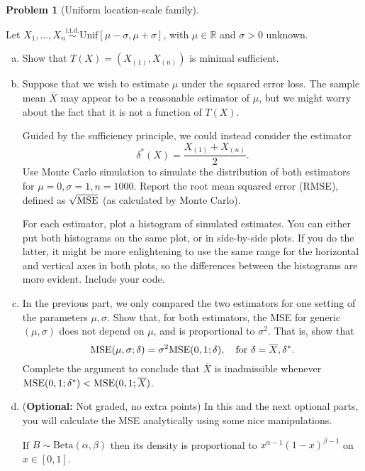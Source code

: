 \documentclass{article}
\newcommand{\RR}{\mathbb{R}}
\newcommand{\MSE}{\textnormal{MSE}}
\newcommand{\simiid}{\overset{\text{i.i.d.}}{\sim}}
\theoremstyle{definition}
\newtheorem{problem}{Problem}
\begin{document}
\begin{problem}[Uniform location-scale family]
\label{prob:uniflocscale}

Let $X_1, \ldots, X_n\simiid \text{Unif}[\mu-\sigma, \mu + \sigma]$, with $\mu\in\RR$ and $\sigma > 0$ unknown.
%
\begin{enumerate}[(a)]
\item Show that $T(X) = (X_{(1)}, X_{(n)})$ is minimal sufficient.



\item Suppose that we wish to estimate $\mu$ under the squared error loss.  The sample mean $\overline{X}$ may appear to be a reasonable estimator of $\mu$, but we might worry about the fact that it is not a function of $T(X)$.

Guided by the sufficiency principle, we could instead consider the estimator 
\[\delta^*(X) = \frac{X_{(1)} + X_{(n)}}{2}.\] 
Use Monte Carlo simulation to simulate the distribution of both estimators for $\mu = 0, \sigma = 1, n = 1000$. Report the root mean squared error (RMSE), defined as $\sqrt{\MSE}$ (as calculated by Monte Carlo).

For each estimator, plot a histogram of simulated estimates. You can either put both histograms on the same plot, or in side-by-side plots. If you do the latter, it might be more enlightening to use the same range for the horizontal and vertical axes in both plots, so the differences between the histograms are more evident. Include your code.




\item In the previous part, we only compared the two estimators for one setting of the parameters $\mu,\sigma$. Show that, for both estimators, the MSE for generic $(\mu,\sigma)$ does not depend on $\mu$, and is proportional to $\sigma^2$. That is, show that
\[
\MSE(\mu, \sigma; \delta) = \sigma^2 \MSE(0,1; \delta), \quad \text{for } \delta = \overline{X}, \delta^*.
\]
Complete the argument to conclude that $\overline{X}$ is inadmissible whenever $\MSE(0,1;\delta^*) < \MSE(0,1;\overline{X})$.

\item ({\bf Optional:} Not graded, no extra points) In this and the next optional parts, you will calculate the MSE analytically using some nice manipulations. 

If $B \sim \text{Beta}(\alpha,\beta)$ then its density is proportional to $x^{\alpha-1}(1-x)^{\beta-1}$ on $x\in [0,1]$.


\end{enumerate}
\end{problem}
\end{document}
